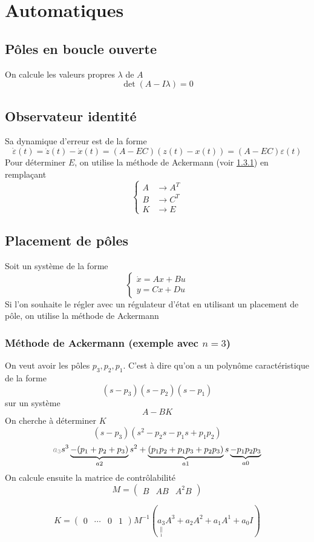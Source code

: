 \documentclass[resume]{subfiles}
\begin{document}
\section{Automatiques}
\subsection{Pôles en boucle ouverte}
On calcule les valeurs propres $\lambda$ de $A$
$$\det\left(A-I\lambda\right)=0$$
\subsection{Observateur identité}
Sa dynamique d'erreur est de la forme
$$\dot{\varepsilon}(t)=\dot{z}(t)-\dot{x}(t)=(A-EC)(z(t)-x(t))=(A-EC)\varepsilon(t)$$
Pour déterminer $E$, on utilise la méthode de Ackermann (voir \ref{ackermann}) en remplaçant
$$\begin{cases}
A & \longrightarrow A^{T}\\
B & \longrightarrow C^{T}\\
K & \longrightarrow E
\end{cases}$$
\subsection{Placement de pôles}
Soit un système de la forme
$$\begin{cases}
\dot{x} = Ax+Bu\\
y = Cx + Du
\end{cases}$$
Si l'on souhaite le régler avec un régulateur d'état en utilisant un placement de pôle, on utilise la méthode de Ackermann
\subsubsection{Méthode de Ackermann (exemple avec $n=3$)}
\label{ackermann}
On veut avoir les pôles $p_3,p_2,p_1$. C'est à dire qu'on a un polynôme caractéristique de la forme
$$(s-p_3)(s-p_2)(s-p_1)$$
sur un système
$$A-BK$$
On cherche à déterminer $K$
$$(s-p_3)(s^2-p_2s-p_1s+p_1p_2)$$
$$\textcolor{gray}{a_3}s^3\underbrace{-(p_1+p_2+p_3)}_{a2}s^2+\underbrace{(p_1p_2+p_1p_3+p_2p_3)}_{a1}s\underbrace{-p_1p_2p_3}_{a0}$$
On calcule ensuite la matrice de contrôlabilité
$$M=\begin{pmatrix}
B & AB & A^2B
\end{pmatrix}$$


$$K = \begin{pmatrix}
0 & \cdots & 0 & 1
\end{pmatrix}M^{-1}\left(\underset{\underset{1}{\parallel}}{a_3}A^{3}+a_2A^2+a_1A^1+a_0I\right)$$
\end{document}
